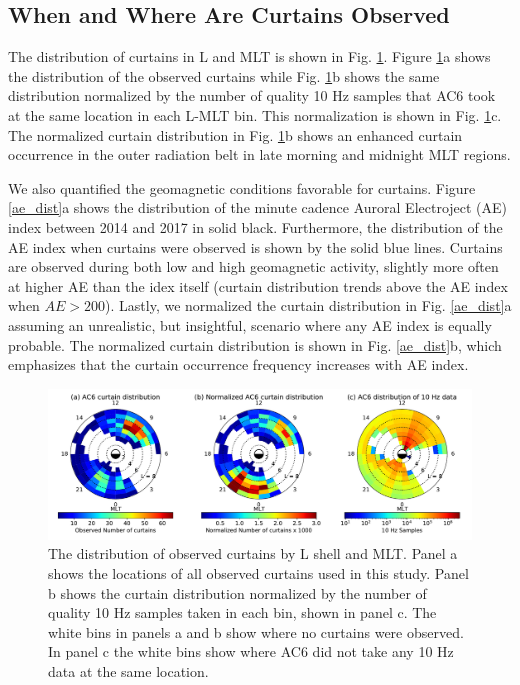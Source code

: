 \documentclass[draft]{agujournal2019}
\begin{document}
\subsection{When and Where Are Curtains Observed}
The distribution of curtains in L and MLT is shown in Fig. \ref{l_mlt_dist}. Figure \ref{l_mlt_dist}a shows the distribution of the observed curtains while Fig. \ref{l_mlt_dist}b shows the same distribution normalized by the number of quality 10 Hz samples that AC6 took at the same location in each L-MLT bin. This normalization is shown in Fig. \ref{l_mlt_dist}c. The normalized curtain distribution in Fig. \ref{l_mlt_dist}b shows an enhanced curtain occurrence in the outer radiation belt in late morning and midnight MLT regions.

We also quantified the geomagnetic conditions favorable for curtains. Figure \ref{ae_dist}a shows the distribution of the minute cadence Auroral Electroject (AE) index between 2014 and 2017 in solid black. Furthermore, the distribution of the AE index when curtains were observed is shown by the solid blue lines. Curtains are observed during both low and high geomagnetic activity, slightly more often at higher AE than the idex itself (curtain distribution trends above the AE index when $AE > 200$). Lastly, we normalized the curtain distribution in Fig. \ref{ae_dist}a assuming an unrealistic, but insightful, scenario where any AE index is equally probable. The normalized curtain distribution is shown in Fig. \ref{ae_dist}b, which emphasizes that the curtain occurrence frequency increases with AE index.

\begin{figure}
\includegraphics[width=\textwidth]{fig2_3.pdf}
\caption{The distribution of observed curtains by L shell and MLT. Panel a shows the locations of all observed curtains used in this study. Panel b shows the curtain distribution normalized by the number of quality 10 Hz samples taken in each bin, shown in panel c. The white bins in panels a and b show where no curtains were observed. In panel c the white bins show where AC6 did not take any 10 Hz data at the same location.}
\label{l_mlt_dist}
\end{figure}
\end{document}
